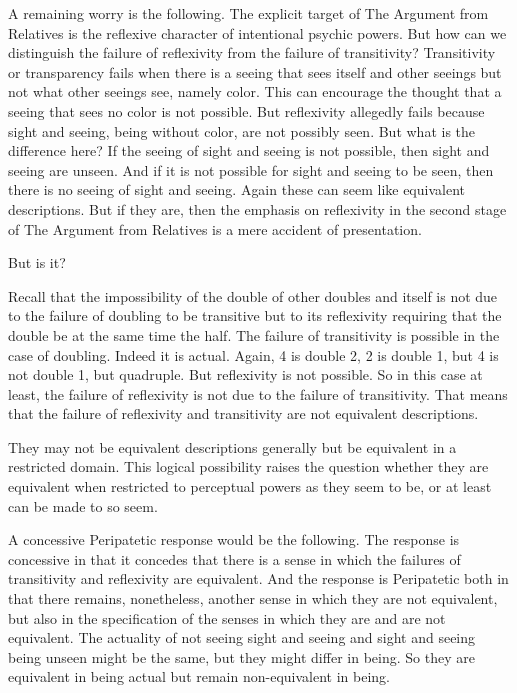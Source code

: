 A remaining worry is the following. The explicit target of The Argument from Relatives is the reflexive character of intentional psychic powers. But how can we distinguish the failure of reflexivity from the failure of transitivity? Transitivity or transparency fails when there is a seeing that sees itself and other seeings but not what other seeings see, namely color. This can encourage the thought that a seeing that sees no color is not possible. But reflexivity allegedly fails because sight and seeing, being without color, are not possibly seen. But what is the difference here? If the seeing of sight and seeing is not possible, then sight and seeing are unseen. And if it is not possible for sight and seeing to be seen, then there is no seeing of sight and seeing. Again these can seem like equivalent descriptions. But if they are, then the emphasis on reflexivity in the second stage of The Argument from Relatives is a mere accident of presentation.

But is it?

Recall that the impossibility of the double of other doubles and itself is not due to the failure of doubling to be transitive but to its reflexivity requiring that the double be at the same time the half. The failure of transitivity is possible in the case of doubling. Indeed it is actual. Again, 4 is double 2, 2 is double 1, but 4 is not double 1, but quadruple. But reflexivity is not possible. So in this case at least, the failure of reflexivity is not due to the failure of transitivity. That means that the failure of reflexivity and transitivity are not equivalent descriptions.

They may not be equivalent descriptions generally but be equivalent in a restricted domain. This logical possibility raises the question whether they are equivalent when restricted to perceptual powers as they seem to be, or at least can be made to so seem.

A concessive Peripatetic response would be the following. The response is concessive in that it concedes that there is a sense in which the failures of transitivity and reflexivity are equivalent. And the response is Peripatetic both in that there remains, nonetheless, another sense in which they are not equivalent, but also in the specification of the senses in which they are and are not equivalent. The actuality of not seeing sight and seeing and sight and seeing being unseen might be the same, but they might differ in being. So they are equivalent in being actual but remain non-equivalent in being.

